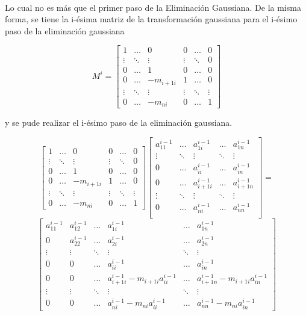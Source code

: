 \

Lo cual no es más que el primer paso de la Eliminación Gaussiana. De la misma forma, se tiene la i-ésima matriz de la transformación gaussiana para el i-ésimo paso de la eliminación gaussiana 

\[
M^i =
\begin{bmatrix}
1 & \ldots & 0  & 0 & \ldots & 0 \\
\vdots & \ddots & \vdots & \vdots & \ddots & 0 \\
0  & \ldots & 1 & 0 & \ldots & 0 \\
0 & \ldots & -m_{i+1i} & 1 & \ldots & 0 \\
\vdots  & \ddots & \vdots & \vdots & \ddots & \vdots \\
0 & \ldots & -m_{ni} & 0 & \ldots & 1 
\end{bmatrix}
\]

y se pude realizar el i-ésimo paso de la eliminación gaussiana.

\[
\begin{bmatrix}
1 & \ldots & 0  & 0 & \ldots & 0 \\
\vdots & \ddots & \vdots & \vdots & \ddots & 0 \\
0  & \ldots & 1 & 0 & \ldots & 0 \\
0 & \ldots & -m_{i+1i} & 1 & \ldots & 0 \\
\vdots  & \ddots & \vdots & \vdots & \ddots & \vdots \\
0 & \ldots & -m_{ni} & 0 & \ldots & 1 
\end{bmatrix}
\begin{bmatrix}
a_{11}^{i-1} & \ldots & a_{1i}^{i-1} & \ldots & a_{1n}^{i-1} \\
\vdots & \ddots & \vdots & \ddots & \vdots \\
0 & \ldots & a_{ii}^{i-1} & \ldots & a_{in}^{i-1} \\
0 & \ldots & a_{i+1i}^{i-1} & \ldots & a_{i+1n}^{i-1} \\
\vdots & \ddots & \vdots & \ddots & \vdots \\
0 & \ldots & a_{ni}^{i-1} & \ldots & a_{nn}^{i-1} \\
\end{bmatrix}
=
\]
\[
\begin{bmatrix}
a_{11}^{i-1} & a_{12}^{i-1} & \ldots & a_{1i}^{i-1} & \ldots & a_{1n}^{i-1} \\
0 & a_{22}^{i-1} & \ldots & a_{2i}^{i-1} & \ldots & a_{2n}^{i-1} \\
\vdots & \vdots & \ddots & \vdots & \ddots & \vdots \\
0 & 0 & \ldots & a_{ii}^{i-1} & \ldots & a_{in}^{i-1} \\
0 & 0 & \ldots & a_{i+1i}^{i-1}-m_{i+1i}a_{ii}^{i-1} & \ldots & a_{i+1n}^{i-1}-m_{i+1i}a_{in}^{i-1} \\
\vdots & \vdots & \ddots & \vdots & \ddots & \vdots \\
0 & 0 & \ldots & a_{ni}^{i-1}-m_{ni}a_{ii}^{i-1} & \ldots & a_{nn}^{i-1}-m_{ni}a_{in}^{i-1}
\end{bmatrix}
\]

